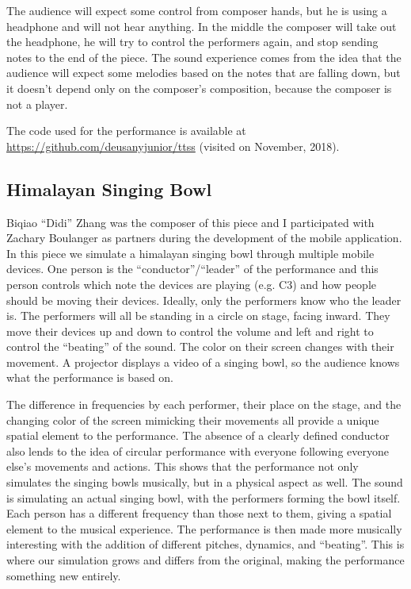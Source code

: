 The audience will expect some control from composer hands, but he is using a headphone and will not hear anything. 
In the middle the composer will take out the headphone, he will try to control the performers again, and stop sending notes to the end of the piece.
The sound experience comes from the idea that the audience will expect some melodies based on the notes that are falling down, but it doesn't depend only on the composer's composition, because the composer is not a player.

The code used for the performance is available at \url{https://github.com/deusanyjunior/ttss} (visited on November, 2018).

\subsection*{Himalayan Singing Bowl}

Biqiao ``Didi'' Zhang was the composer of this piece and I participated with Zachary Boulanger as partners during the development of the mobile application.
In this piece we simulate a himalayan singing bowl through multiple mobile devices. 
One person is the ``conductor''/``leader'' of the performance and this person controls which note the devices are playing (e.g. C3) and how people should be moving their devices. 
Ideally, only the performers know who the leader is.
The performers will all be standing in a circle on stage, facing inward. 
They move their devices up and down to control the volume and left and right to control the ``beating'' of the sound. 
The color on their screen changes with their movement. 
A projector displays a video of a singing bowl, so the audience knows what the performance is based on.

The difference in frequencies by each performer, their place on the stage, and the changing color of the screen mimicking their movements all provide a unique spatial element to the performance. 
The absence of a clearly defined conductor also lends to the idea of circular performance with everyone following everyone else’s movements and actions. 
This shows that the performance not only simulates the singing bowls musically, but in a physical aspect as well.
The sound is simulating an actual singing bowl, with the performers forming the bowl itself. 
Each person has a different frequency than those next to them, giving a spatial element to the musical experience. 
The performance is then made more musically interesting with the addition of different pitches, dynamics, and ``beating''. 
This is where our simulation grows and differs from the original, making the performance something new entirely.

